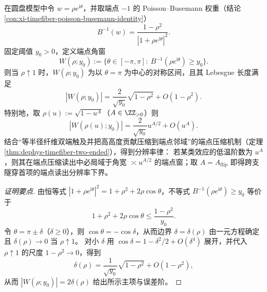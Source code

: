 \begin{conclusion}\label{con:xi-split-tunneling-endpoint-window-sqrt-law}
在圆盘模型中令 \(w=\rho e^{\mathrm{i}\theta}\)，并取端点 \(-1\) 的 Poisson--Busemann 权重（结论 \ref{con:xi-timefiber-poisson-busemann-identity}）
\[
B^{-1}(w)=\frac{1-\rho^2}{|1+\rho e^{\mathrm{i}\theta}|^2}.
\]
固定阈值 \(y_0>0\)，定义端点角窗
\[
W(\rho;y_0):=\bigl\{\theta\in[-\pi,\pi]:\ B^{-1}(\rho e^{\mathrm{i}\theta})\ge y_0\bigr\}.
\]
则当 \(\rho\uparrow 1\) 时，\(W(\rho;y_0)\) 为以 \(\theta=\pi\) 为中心的对称区间，且其 Lebesgue 长度满足
\[
|W(\rho;y_0)|
=
\frac{2}{\sqrt{y_0}}\sqrt{1-\rho^2}+O(1-\rho^2).
\]
特别地，取 \(\rho(u):=\sqrt{1-u^{A}}\)（\(A\in\ZZ_{>0}\)）则
\[
|W(\rho(u);y_0)|
=
\frac{2}{\sqrt{y_0}}u^{A/2}+O(u^{A}).
\]
结合“等半径纤维双端触及并把高高度贡献压缩到端点邻域”的端点压缩机制（定理 \ref{thm:dephys-timefiber-two-ended}），得到分辨率律：
若某类效应的低温阶数为 \(u^{A}\)，则其在端点压缩读出中必局域于角宽 \(\asymp u^{A/2}\) 的端点窗；取 \(A=A_{\mathrm{flip}}\) 即得跨支隧穿首项的端点读出分辨率下界。
\end{conclusion}
\begin{proof}[证明要点]
由恒等式 \(|1+\rho e^{\mathrm{i}\theta}|^2=1+\rho^2+2\rho\cos\theta\)，不等式 \(B^{-1}(\rho e^{\mathrm{i}\theta})\ge y_0\) 等价于
\[
1+\rho^2+2\rho\cos\theta\le \frac{1-\rho^2}{y_0}.
\]
令 \(\theta=\pi\pm\delta\)（\(\delta\ge 0\)），则 \(\cos\theta=-\cos\delta\)，从而边界 \(\delta=\delta(\rho)\) 由一元方程确定且 \(\delta(\rho)\to 0\) 当 \(\rho\uparrow 1\)。
对小 \(\delta\) 用 \(\cos\delta=1-\delta^2/2+O(\delta^4)\) 展开，并代入 \(\rho\uparrow 1\) 的尺度 \(1-\rho^2\to 0\)，得到
\[
\delta(\rho)=\frac{1}{\sqrt{y_0}}\sqrt{1-\rho^2}+O(1-\rho^2),
\]
从而 \(|W(\rho;y_0)|=2\delta(\rho)\) 给出所示主项与误差阶。
\end{proof}

